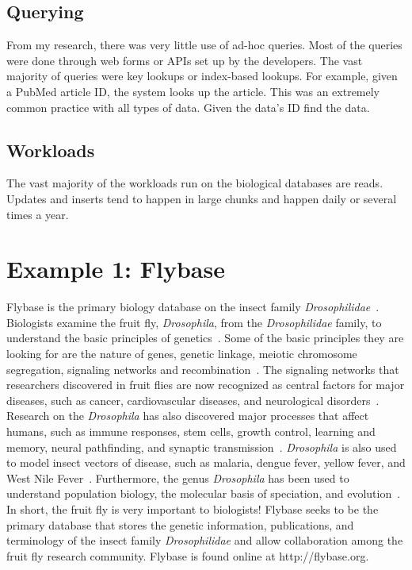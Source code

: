 \documentclass[12pt]{ucthesis}
\begin{document}
\subsection{Querying}
From my research, there was very little use of ad-hoc queries. Most of the queries were done through web forms
or APIs set up by the developers. The vast majority of queries were key lookups or index-based lookups. For example, given a PubMed article ID, the system looks up the article. This was an extremely common practice with all types of data. Given the data's ID find the data.

\subsection{Workloads}
The vast majority of the workloads run on the biological databases are reads. Updates and inserts tend to happen in large chunks and happen daily or several times a year.

\section{Example 1: Flybase}
Flybase is the primary biology database on the insect family \textit{Drosophilidae}~\cite{flybase_go}. Biologists examine the fruit fly, \textit{Drosophila},
from the \textit{Drosophilidae} family, to understand the basic principles of genetics~\cite{flybase_board_paper}. Some of the basic principles they are looking for are the nature of genes, genetic linkage, meiotic chromosome segregation, signaling networks and recombination~\cite{flybase_board_paper}. The signaling networks that researchers discovered in fruit flies are now recognized as central factors for major diseases, such as cancer, cardiovascular diseases, and neurological disorders~\cite{flybase_board_paper}. Research on the \textit{Drosophila} has also discovered major processes that affect humans, such as immune responses, stem cells, growth control, learning and memory, neural pathfinding, and synaptic transmission~\cite{flybase_board_paper}. \textit{Drosophila} is also used to model insect vectors of disease, such as malaria, dengue fever, yellow fever, and West Nile Fever~\cite{flybase_board_paper}. Furthermore, the genus \textit{Drosophila} has been used to understand population biology, the molecular basis of speciation, and evolution~\cite{flybase_board_paper}. In short, the fruit fly is very important to biologists! Flybase seeks to be the primary database that stores the genetic information, publications, and terminology of the insect family \textit{Drosophilidae} and allow collaboration among the fruit fly research community. Flybase is found online at \textsf{http://flybase.org}.
\end{document}

